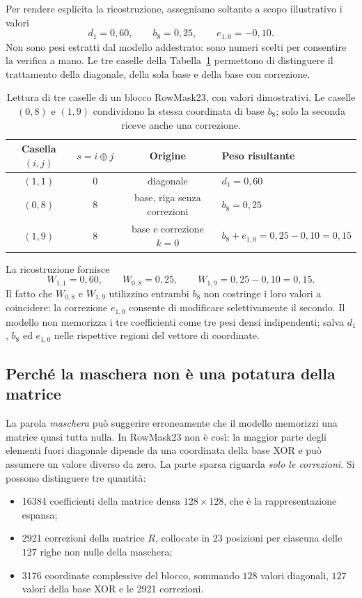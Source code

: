 Per rendere esplicita la ricostruzione, assegniamo soltanto a scopo illustrativo i valori
\[
d_1=0{,}60,\qquad b_8=0{,}25,\qquad e_{1,0}=-0{,}10.
\]
Non sono pesi estratti dal modello addestrato: sono numeri scelti per consentire la verifica a mano. Le tre caselle della Tabella~\ref{fig:lettura-casella-rowmask} permettono di distinguere il trattamento della diagonale, della sola base e della base con correzione.

\begin{table}[htbp]
\centering
\small
\begin{tabular}{cccl}
\toprule
Casella $(i,j)$ & $s=i\oplus j$ & Origine & Peso risultante \\
\midrule
$(1,1)$ & $0$ & diagonale & $d_1 = 0{,}60$ \\
$(0,8)$ & $8$ & base, riga senza correzioni & $b_8 = 0{,}25$ \\
$(1,9)$ & $8$ & base e correzione $k=0$ & $b_8 + e_{1,0} = 0{,}25 - 0{,}10 = 0{,}15$ \\
\bottomrule
\end{tabular}
\caption{Lettura di tre caselle di un blocco RowMask23, con valori dimostrativi. Le caselle $(0,8)$ e $(1,9)$ condividono la stessa coordinata di base $b_8$; solo la seconda riceve anche una correzione.}
\label{fig:lettura-casella-rowmask}
\end{table}

La ricostruzione fornisce
\[
W_{1,1}=0{,}60,\qquad W_{0,8}=0{,}25,\qquad
W_{1,9}=0{,}25-0{,}10=0{,}15.
\]
Il fatto che $W_{0,8}$ e $W_{1,9}$ utilizzino entrambi $b_8$ non costringe i loro valori a coincidere: la correzione $e_{1,0}$ consente di modificare selettivamente il secondo. Il modello non memorizza i tre coefficienti come tre pesi densi indipendenti; salva $d_1$, $b_8$ ed $e_{1,0}$ nelle rispettive regioni del vettore di coordinate.

\subsection{Perché la maschera non è una potatura della matrice}
\label{sec:non-potatura-rowmask}

La parola \emph{maschera} può suggerire erroneamente che il modello memorizzi una matrice quasi tutta nulla. In RowMask23 non è così: la maggior parte degli elementi fuori diagonale dipende da una coordinata della base XOR e può assumere un valore diverso da zero. La parte sparsa riguarda \emph{solo le correzioni}. Si possono distinguere tre quantità:
\begin{itemize}
\item \num{16384} coefficienti della matrice densa $128\times128$, che è la rappresentazione espansa;
\item \num{2921} correzioni della matrice $R$, collocate in $23$ posizioni per ciascuna delle $127$ righe non nulle della maschera;
\item \num{3176} coordinate complessive del blocco, sommando $128$ valori diagonali, $127$ valori della base XOR e le \num{2921} correzioni.
\end{itemize}

